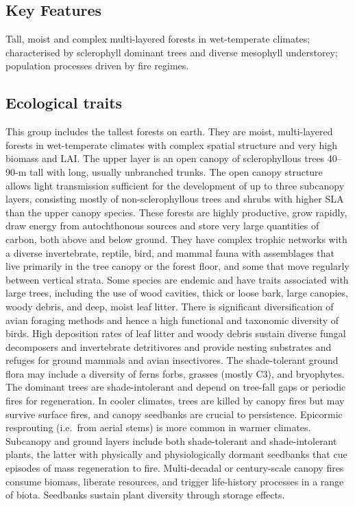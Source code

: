 \documentclass[
  letterpaper,
  DIV=11,
  numbers=noendperiod]{scrartcl}
\begin{document}
\subsection{Key Features}\label{key-features-77}

Tall, moist and complex multi-layered forests in wet-temperate climates;
characterised by sclerophyll dominant trees and diverse mesophyll
understorey; population processes driven by fire regimes.

\subsection{Ecological traits}\label{ecological-traits-77}

This group includes the tallest forests on earth. They are moist,
multi-layered forests in wet-temperate climates with complex spatial
structure and very high biomass and LAI. The upper layer is an open
canopy of sclerophyllous trees 40--90-m tall with long, usually
unbranched trunks. The open canopy structure allows light transmission
sufficient for the development of up to three subcanopy layers,
consisting mostly of non-sclerophyllous trees and shrubs with higher SLA
than the upper canopy species. These forests are highly productive, grow
rapidly, draw energy from autochthonous sources and store very large
quantities of carbon, both above and below ground. They have complex
trophic networks with a diverse invertebrate, reptile, bird, and mammal
fauna with assemblages that live primarily in the tree canopy or the
forest floor, and some that move regularly between vertical strata. Some
species are endemic and have traits associated with large trees,
including the use of wood cavities, thick or loose bark, large canopies,
woody debris, and deep, moist leaf litter. There is significant
diversification of avian foraging methods and hence a high functional
and taxonomic diversity of birds. High deposition rates of leaf litter
and woody debris sustain diverse fungal decomposers and invertebrate
detritivores and provide nesting substrates and refuges for ground
mammals and avian insectivores. The shade-tolerant ground flora may
include a diversity of ferns forbs, grasses (mostly C3), and bryophytes.
The dominant trees are shade-intolerant and depend on tree-fall gaps or
periodic fires for regeneration. In cooler climates, trees are killed by
canopy fires but may survive surface fires, and canopy seedbanks are
crucial to persistence. Epicormic resprouting (i.e.~from aerial stems)
is more common in warmer climates. Subcanopy and ground layers include
both shade-tolerant and shade-intolerant plants, the latter with
physically and physiologically dormant seedbanks that cue episodes of
mass regeneration to fire. Multi-decadal or century-scale canopy fires
consume biomass, liberate resources, and trigger life-history processes
in a range of biota. Seedbanks sustain plant diversity through storage
effects.
\end{document}
